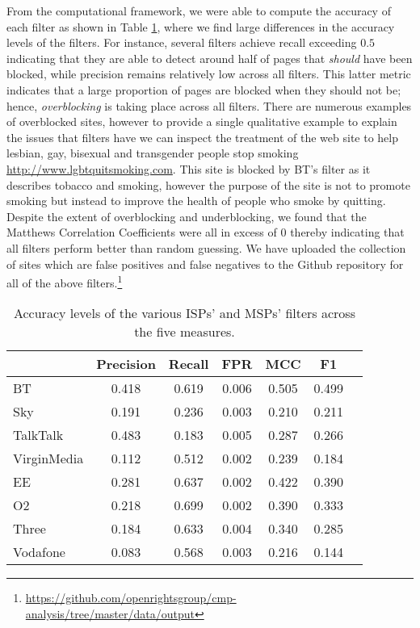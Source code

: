\documentclass{bmcart}
\begin{document}
From the computational framework, we were able to compute the accuracy of each filter as shown in Table \ref{tab:accuracy}, where we find large differences in the accuracy levels of the filters.
For instance, several filters achieve recall exceeding $0.5$ indicating that they are able to detect around half of pages that \textit{should} have been blocked, while precision remains relatively low across all filters.
This latter metric indicates that a large proportion of pages are blocked when they should not be; hence, \textit{overblocking} is taking place across all filters.
There are numerous examples of overblocked sites, however to provide a single qualitative example to explain the issues that filters have we can inspect the treatment of the web site to help lesbian, gay, bisexual and transgender people stop smoking \url{http://www.lgbtquitsmoking.com}.
This site is blocked by BT's filter as it describes tobacco and smoking, however the purpose of the site is not to promote smoking but instead to improve the health of people who smoke by quitting.
Despite the extent of overblocking and underblocking, we found that the Matthews Correlation Coefficients were all in excess of $0$ thereby indicating that all filters perform better than random guessing.
We have uploaded the collection of sites which are false positives and false negatives to the Github repository for all of the above filters.\footnote{\url{https://github.com/openrightsgroup/cmp-analysis/tree/master/data/output}}

\begin{table}[h!]
\caption{Accuracy levels of the various ISPs' and MSPs' filters across the five measures.}
  \begin{tabular}{ l c c c c c c}
    \hline
     & Precision & Recall & FPR & MCC & F1 \\
    \hline
	BT & 0.418 & 0.619 & 0.006 & 0.505 & 0.499 \\
    Sky & 0.191 & 0.236 & 0.003 & 0.210 & 0.211 \\
    TalkTalk & 0.483 & 0.183 & 0.005 & 0.287 & 0.266 \\
	VirginMedia & 0.112 & 0.512 & 0.002 & 0.239 & 0.184 \\
	\hline    
	EE & 0.281 & 0.637 & 0.002 & 0.422 & 0.390 \\
	O2 & 0.218 & 0.699 & 0.002 & 0.390 & 0.333 \\
	Three & 0.184 & 0.633 & 0.004 & 0.340 & 0.285 \\
	Vodafone & 0.083 & 0.568 & 0.003 & 0.216 & 0.144 \\
    \hline
  \end{tabular}
  \label{tab:accuracy}
\end{table}
\end{document}
